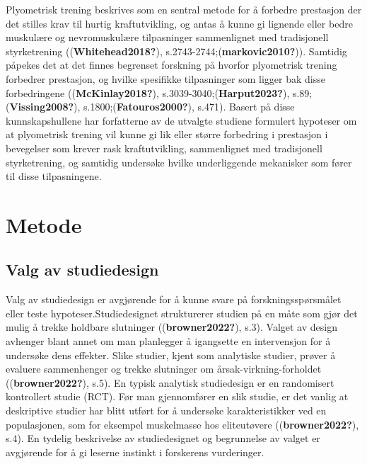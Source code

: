 \documentclass[
  letterpaper,
  DIV=11,
  numbers=noendperiod]{scrreprt}
\begin{document}
Plyometrisk trening beskrives som en sentral metode for å forbedre
prestasjon der det stilles krav til hurtig kraftutvikling, og antas å
kunne gi lignende eller bedre muskulære og nevromuskulære tilpasninger
sammenlignet med tradisjonell styrketrening ((\textbf{Whitehead2018?}),
s.2743-2744;(\textbf{markovic2010?})). Samtidig påpekes det at det
finnes begrenset forskning på hvorfor plyometrisk trening forbedrer
prestasjon, og hvilke spesifikke tilpasninger som ligger bak disse
forbedringene ((\textbf{McKinlay2018?}),
s.3039-3040;(\textbf{Harput2023?}), s.89;(\textbf{Vissing2008?}),
s.1800;(\textbf{Fatouros2000?}), s.471). Basert på disse
kunnskapshullene har forfatterne av de utvalgte studiene formulert
hypoteser om at plyometrisk trening vil kunne gi lik eller større
forbedring i prestasjon i bevegelser som krever rask kraftutvikling,
sammenlignet med tradisjonell styrketrening, og samtidig undersøke
hvilke underliggende mekanisker som fører til disse tilpasningene.

\section{Metode}\label{metode-4}

\subsection{Valg av studiedesign}\label{valg-av-studiedesign}

Valg av studiedesign er avgjørende for å kunne svare på
forskningsspørsmålet eller teste hypoteser.Studiedesignet strukturerer
studien på en måte som gjør det mulig å trekke holdbare slutninger
((\textbf{browner2022?}), s.3). Valget av design avhenger blant annet om
man planlegger å igangsette en intervensjon for å undersøke dens
effekter. Slike studier, kjent som analytiske studier, prøver å evaluere
sammenhenger og trekke slutninger om årsak-virkning-forholdet
((\textbf{browner2022?}), s.5). En typisk analytisk studiedesign er en
randomisert kontrollert studie (RCT). Før man gjennomfører en slik
studie, er det vanlig at deskriptive studier har blitt utført for å
undersøke karakteristikker ved en populasjonen, som for eksempel
muskelmasse hos eliteutøvere ((\textbf{browner2022?}), s.4). En tydelig
beskrivelse av studiedesignet og begrunnelse av valget er avgjørende for
å gi leserne instinkt i forskerens vurderinger.
\end{document}
